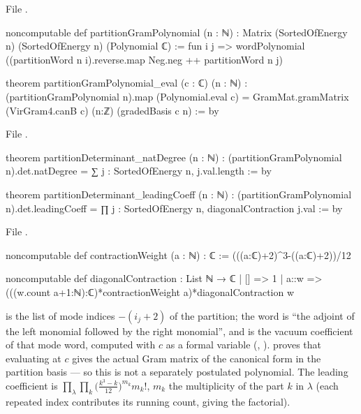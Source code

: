 File .
\begin{leancode}
noncomputable def partitionGramPolynomial (n : ℕ) :
    Matrix (SortedOfEnergy n) (SortedOfEnergy n) (Polynomial ℂ) :=
  fun i j => wordPolynomial ((partitionWord n i).reverse.map Neg.neg ++ partitionWord n j)

theorem partitionGramPolynomial_eval (c : ℂ) (n : ℕ) :
    (partitionGramPolynomial n).map (Polynomial.eval c) =
      GramMat.gramMatrix (VirGram4.canB c) (n:ℤ) (gradedBasis c n) := by
\end{leancode}
File .
\begin{leancode}
theorem partitionDeterminant_natDegree (n : ℕ) :
    (partitionGramPolynomial n).det.natDegree = ∑ j : SortedOfEnergy n, j.val.length := by

theorem partitionDeterminant_leadingCoeff (n : ℕ) :
    (partitionGramPolynomial n).det.leadingCoeff =
      ∏ j : SortedOfEnergy n, diagonalContraction j.val := by
\end{leancode}
File .
\begin{leancode}
noncomputable def contractionWeight (a : ℕ) : ℂ :=
  (((a:ℂ)+2)^3-((a:ℂ)+2))/12

noncomputable def diagonalContraction : List ℕ → ℂ
  | [] => 1
  | a::w => (((w.count a+1:ℕ):ℂ)*contractionWeight a)*diagonalContraction w
\end{leancode}

\begin{dictionary}
 is the list of mode indices $-(i_j+2)$ of the partition; the word
\allowbreak{}\allowbreak{}\allowbreak{} is ``the adjoint of the left
monomial followed by the right monomial'', and  is the vacuum coefficient of that
mode word, computed with $c$ as a formal variable (,
). \allowbreak{} proves that evaluating at $c$ gives the
actual Gram matrix of the canonical form in the partition basis --- so this is not a separately postulated
polynomial. The leading coefficient is $\prod_\lambda\prod_k\bigl(\frac{k^3-k}{12}\bigr)^{m_k}m_k!$, $m_k$ the
multiplicity of the part $k$ in $\lambda$ (each repeated index contributes its running count, giving the
factorial).
\end{dictionary}

